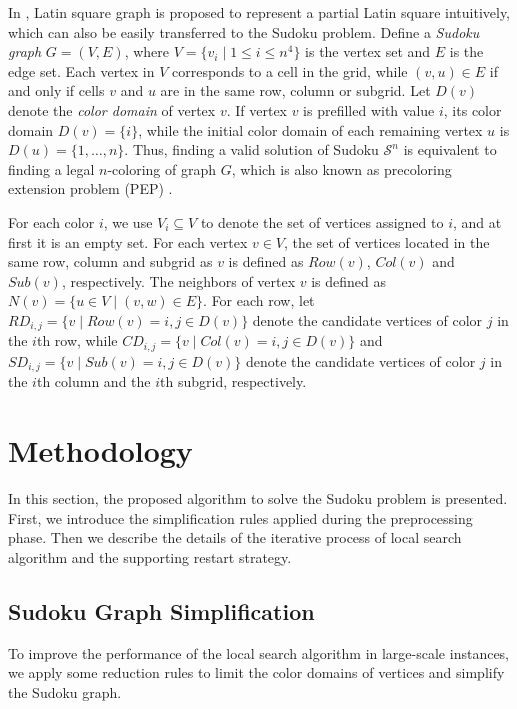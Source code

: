 \documentclass{article}
\begin{document}

In \cite{DBLP:journals/tec/JinH19,pan2022fast}, {Latin square graph} is proposed to represent a partial Latin square intuitively, which can also be easily transferred to the Sudoku problem.
Define a {\it Sudoku graph} $G = (V,E)$, where $V=\{v_{i} \mid 1 \leq i \leq n^4\}$ is the vertex set and $E$ is the edge set. Each vertex in $V$ corresponds to a cell in the grid, while $(v,u) \in E$ if and only if cells $v$ and $u$ are in the same row, column or subgrid.
Let $D(v)$ denote the {\it color domain} of vertex $v$. If vertex $v$ is prefilled with value $i$, its color domain $D(v) = \{i\}$, while the initial color domain of each remaining vertex $u$ is $D(u) = \{ 1, \dots, n \}$.
Thus, finding a valid solution of Sudoku $\mathcal{S}^n$ is equivalent to finding a legal $n$-coloring of graph $G$, which is also known as precoloring extension problem (PEP) \cite{Bir1992PrecoloringEI}.

For each color $i$, we use $V_i \subseteq V$ to denote the set of vertices assigned to $i$, and at first it is an empty set. For each vertex $v \in V$, the set of vertices located in the same row, column and subgrid as $v$ is defined as $Row(v)$, $Col(v)$ and $Sub(v)$, respectively. The neighbors of vertex $v$ is defined as $N(v) = \{ u \in V \mid (v,w) \in E \}$. For each row, let $RD_{i,j} = \{v \mid Row(v) = i, j \in D(v) \}$ denote the candidate vertices of color $j$ in the $i$th row, while $CD_{i,j} = \{v \mid Col(v) = i, j \in D(v) \}$ and $SD_{i,j} = \{v \mid Sub(v) = i, j \in D(v) \}$ denote the candidate vertices of color $j$ in the $i$th column and the $i$th subgrid, respectively.

\section{Methodology}

In this section, the proposed algorithm to solve the Sudoku problem is presented. First, we introduce the simplification rules applied during the preprocessing phase. Then we describe the details of the iterative process of local search algorithm and the supporting restart strategy.

\subsection{Sudoku Graph Simplification}

To improve the performance of the local search algorithm in large-scale instances, we apply some reduction rules to limit the color domains of vertices and simplify the Sudoku graph.
\end{document}

